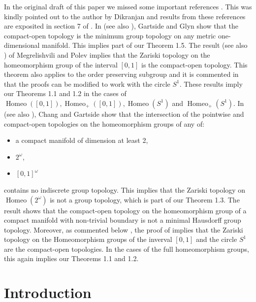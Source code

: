 \documentclass[11pt]{amsart}
\begin{document}
In the original draft of this paper we missed some important references \cite{GARTSIDE2003103,interval1,chang2017minimum}. This was kindly pointed out to the author by Dikranjan and results from these references are exposited in section 7 of \cite{zbMATH06893997}. In  \cite[Theorem 1]{GARTSIDE2003103} (see also \cite[Theorem 7.5]{zbMATH06893997}), Gartside and Glyn show that the compact-open topology is the minimum group topology on any metric one-dimensional manifold. This implies part of our Theorem 1.5.
The result \cite[Theorem 3.4]{interval1} (see also \cite[Theorem 7.6]{zbMATH06893997}) of Megrelishvili and Polev implies that the Zariski topology on the homeomorphism group of the interval \([0,1]\) is the compact-open topology. 
This theorem also applies to the order preserving subgroup and it is commented in \cite{interval1} that the proofs can be modified to work with the circle \(S^1\). These results imply our Theorems 1.1 and 1.2 in the cases of \(\operatorname{Homeo}([0,1]),\operatorname{Homeo}_+([0,1]),\operatorname{Homeo}(S^1)\) and \(\operatorname{Homeo}_+(S^1)\).
In \cite[Corollary 2]{chang2017minimum} (see also \cite[Theorem 7.7]{zbMATH06893997}), Chang and Gartside show that the intersection of the pointwise and compact-open topologies on the homeomorphism groups of any of:
\begin{itemize}
    \item a compact manifold of dimension at least 2,
    \item \(2^\omega\),
    \item \([0,1]^\omega\)
\end{itemize}
 contains no indiscrete group topology. 
 This implies that the Zariski topology on \(\operatorname{Homeo}(2^\omega)\) is not a group topology, which is part of our Theorem 1.3.  
The result \cite[Corollary 6]{chang2017minimum} shows that the compact-open topology on the homeomorphism
group of a compact manifold with non-trivial boundary is not a minimal Hausdorff group topology. Moreover, as commented below \cite[Theorem 7.9]{zbMATH06893997}, the proof of \cite[Theorem 7]{chang2017minimum} implies that the Zariski topology on the Homeomorphism groups of the inverval $[0,1]$ and the circle $S^1$ are the compact-open topologies. In the cases of the full homeomorphism groups, this again implies our Theorems 1.1 and 1.2. 



\section{Introduction}
\end{document}
